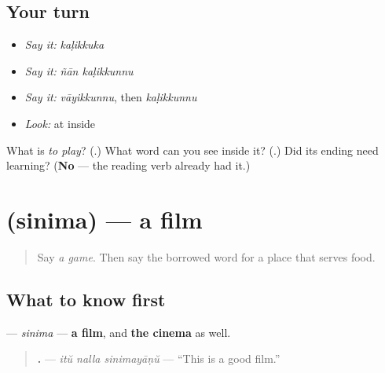 \subsection*{Your turn}
\begin{itemize}
\raggedright
  \item \emph{Say it:} \emph{kaḷikkuka}
  \item \emph{Say it:} \emph{ñān kaḷikkunnu}
  \item \emph{Say it:} \emph{vāyikkunnu}, then \emph{kaḷikkunnu}
  \item \emph{Look:} at \textbf{} inside \textbf{}
\end{itemize}

\begin{tcolorbox}[breakable,colback=teal!4,colframe=teal!35!black,title={Before you move on}]
What is \emph{to play}? (\textbf{}.) What word can you see inside it? (\textbf{}.) Did its ending need learning? (\textbf{No} — the reading verb already had it.)
\end{tcolorbox}
\section[\texorpdfstring{\ml{സിനിമ} (sinima)}{സിനിമ (sinima)}]{ (sinima) — a film}

\label{lesson:ML-C98-sinima}



\begin{quote}
Say \emph{a game}. Then say the borrowed word for a place that serves food.
\end{quote}

\subsection*{What to know first}
\textbf{} — \emph{sinima} — \textbf{a film}, and \textbf{the cinema} as well.

\begin{quote}
\textbf{  .} — \emph{itŭ nalla sinimayāṇŭ} — \textquotedblleft{}This is a good film.\textquotedblright{}
\end{quote}

